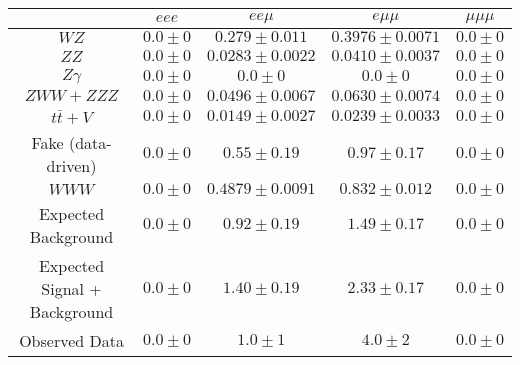 \begin{tabular}{|c||c|c|c|c|}
\hline
 & $eee$ & $ee\mu$ & $e\mu\mu$ & $\mu\mu\mu$\\ 
\hline\hline
$WZ$ &  $0.0 \pm 0$ &  $0.279 \pm 0.011$ &  $0.3976 \pm 0.0071$ &  $0.0 \pm 0$\\ 
$ZZ$ &  $0.0 \pm 0$ &  $0.0283 \pm 0.0022$ &  $0.0410 \pm 0.0037$ &  $0.0 \pm 0$\\ 
$Z\gamma$ &  $0.0 \pm 0$ &  $0.0 \pm 0$ &  $0.0 \pm 0$ &  $0.0 \pm 0$\\ 
$ZWW+ZZZ$ &  $0.0 \pm 0$ &  $0.0496 \pm 0.0067$ &  $0.0630 \pm 0.0074$ &  $0.0 \pm 0$\\ 
$t\bar{t}+V$ &  $0.0 \pm 0$ &  $0.0149 \pm 0.0027$ &  $0.0239 \pm 0.0033$ &  $0.0 \pm 0$\\ 
Fake (data-driven) &  $0.0 \pm 0$ &  $0.55 \pm 0.19$ &  $0.97 \pm 0.17$ &  $0.0 \pm 0$\\ 
$WWW$ &  $0.0 \pm 0$ &  $0.4879 \pm 0.0091$ &  $0.832 \pm 0.012$ &  $0.0 \pm 0$\\ 
\hline
Expected Background &  $0.0 \pm 0$ &  $0.92 \pm 0.19$ &  $1.49 \pm 0.17$ &  $0.0 \pm 0$\\ 
Expected Signal + Background &  $0.0 \pm 0$ &  $1.40 \pm 0.19$ &  $2.33 \pm 0.17$ &  $0.0 \pm 0$\\ 
\hline
Observed Data &  $0.0 \pm 0$ &  $1.0 \pm 1$ &  $4.0 \pm 2$ &  $0.0 \pm 0$\\ 
\hline
\end{tabular}
